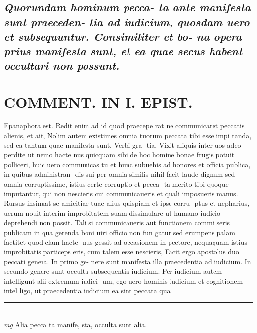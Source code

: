 \documentclass{article}
\begin{document}
\begin{pages}
\subsection*{\textit{Quorundam hominum pecca- ta ante manifesta sunt praeceden- tia ad iudicium, quosdam uero et subsequuntur. Consimiliter et bo- na opera prius manifesta sunt, et ea quae secus habent occultari non possunt. }}
\section*{COMMENT. IN I. EPIST. }\pstart Epanaphora est. Redit enim ad id quod praecepe rat ne communicaret peccatis alienis, et ait, Nolim autem existimes omnia tuorum peccata tibi esse impi tanda, sed ea tantum quae manifesta sunt. Verbi gra- tia, Vixit aliquis inter uos adeo perdite ut nemo hacte nus quicquam sibi de hoc homine bonae frugis potuit polliceri, huic uero communicas tu et hunc subuehis ad honores et officia publica, in quibus administran- dis sui per omnia similis nihil facit laude dignum sed omnia corruptissime, istius certe corruptio et pecca- ta merito tibi quoque imputantur, qui non nescieris cui communicaueris et quali imposueris manus. Rursus insinuat se amicitiae tuae alius quispiam et ipse corru- ptus et nepharius, uerum nouit interim improbitatem suam dissimulare ut humano iudicio deprehendi non possit. Tali si communicaueris aut functionem commi seris publicam in qua gerenda boni uiri officio non fun gatur sed erumpens palam factitet quod clam hacte- nus gessit ad occasionem in pectore, nequaquam istius improbitatis particeps eris, cum talem esse nescieris, Facit ergo apostolus duo peccati genera. In primo ge- nere sunt manifesta illa praecedentia ad iudicium. In secundo genere sunt occulta subsequentia iudicium. Per iudicium autem intelligunt alii extremum iudici- um, ego uero hominis iudicium et cognitionem intel ligo, ut praecedentia iudicium ea sint peccata qua  \pend
\vspace{0.5cm}\noindent
\vspace{0.2cm}\rule{1cm}{0.2pt}\\ 
\hspace{0.2cm}\textit{mg}
\footnotesize Alia pecca ta manife, sta, occulta sunt alia. 
\normalsize| 

\end{pages}
\end{document}
